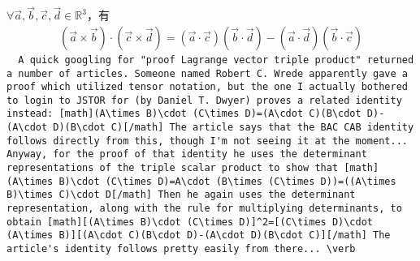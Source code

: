 \begin{example}[Daniel T. Dwyer\footnote{据说可在JSTOR上找到，是1961年的一篇只有一页的论文，未确认，ref. \url{http://forums.xkcd.com/viewtopic.php?t=24061}}]
  $\forall \vec a,\vec b,\vec c,\vec d\in\mathbb{R}^3$，有
  \begin{align*}
    (\vec a\times \vec b) \cdot (\vec c\times \vec d) =
    (\vec a\cdot \vec c)(\vec b\cdot \vec d) - (\vec a\cdot \vec d)(\vec b\cdot \vec c)
  \end{align*}
\verb+  A quick googling for "proof Lagrange vector triple product" returned a number of articles. Someone named Robert C. Wrede apparently gave a proof which utilized tensor notation, but the one I actually bothered to login to JSTOR for (by Daniel T. Dwyer) proves a related identity instead: [math](A\times B)\cdot (C\times D)=(A\cdot C)(B\cdot D)-(A\cdot D)(B\cdot C)[/math] The article says that the BAC CAB identity follows directly from this, though I'm not seeing it at the moment... Anyway, for the proof of that identity he uses the determinant representations of the triple scalar product to show that [math](A\times B)\cdot (C\times D)=A\cdot (B\times (C\times D))=((A\times B)\times C)\cdot D[/math] Then he again uses the determinant representation, along with the rule for multiplying determinants, to obtain [math][(A\times B)\cdot (C\times D)]^2=[(C\times D)\cdot (A\times B)][(A\cdot C)(B\cdot D)-(A\cdot D)(B\cdot C)][/math] The article's identity follows pretty easily from there... \verb+
\end{example}

